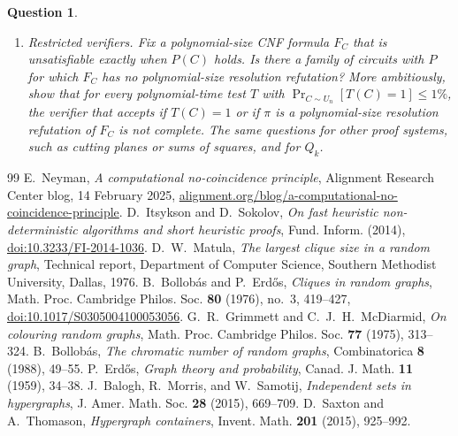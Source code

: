 \documentclass[11pt]{article}
\newtheorem{question}{Question}
\theoremstyle{remark}
\begin{document}
\begin{question}
\begin{enumerate}
\item \emph{Restricted verifiers.} Fix a polynomial-size CNF formula $F_C$ that is unsatisfiable exactly when $P(C)$ holds. Is there a family of circuits with $P$ for which $F_C$ has no polynomial-size resolution refutation? More ambitiously, show that for every polynomial-time test $T$ with $\Pr_{C \sim U_n}[T(C) = 1] \leq 1\%$, the verifier that accepts if $T(C) = 1$ or if $\pi$ is a polynomial-size resolution refutation of $F_C$ is not complete. The same questions for other proof systems, such as cutting planes or sums of squares, and for $Q_k$.
\end{enumerate}
\end{question}

\begin{thebibliography}{99}
E.~Neyman,
\newblock \emph{A computational no-coincidence principle},
\newblock Alignment Research Center blog, 14 February 2025, \href{https://www.alignment.org/blog/a-computational-no-coincidence-principle/}{alignment.org/blog/a-computational-no-coincidence-principle}.
D.~Itsykson and D.~Sokolov,
\newblock \emph{On fast heuristic non-deterministic algorithms and short heuristic proofs},
\newblock Fund. Inform. (2014), \href{https://doi.org/10.3233/FI-2014-1036}{doi:10.3233/FI-2014-1036}.
D.~W.~Matula,
\newblock \emph{The largest clique size in a random graph},
\newblock Technical report, Department of Computer Science, Southern Methodist University, Dallas, 1976.
B.~Bollob\'as and P.~Erd\H{o}s,
\newblock \emph{Cliques in random graphs},
\newblock Math. Proc. Cambridge Philos. Soc. \textbf{80} (1976), no.~3, 419--427, \href{https://doi.org/10.1017/S0305004100053056}{doi:10.1017/S0305004100053056}.
G.~R.~Grimmett and C.~J.~H.~McDiarmid,
\newblock \emph{On colouring random graphs},
\newblock Math. Proc. Cambridge Philos. Soc. \textbf{77} (1975), 313--324.
B.~Bollob\'as,
\newblock \emph{The chromatic number of random graphs},
\newblock Combinatorica \textbf{8} (1988), 49--55.
P.~Erd\H{o}s,
\newblock \emph{Graph theory and probability},
\newblock Canad. J. Math. \textbf{11} (1959), 34--38.
J.~Balogh, R.~Morris, and W.~Samotij,
\newblock \emph{Independent sets in hypergraphs},
\newblock J. Amer. Math. Soc. \textbf{28} (2015), 669--709.
D.~Saxton and A.~Thomason,
\newblock \emph{Hypergraph containers},
\newblock Invent. Math. \textbf{201} (2015), 925--992.

\end{thebibliography}
\end{document}
